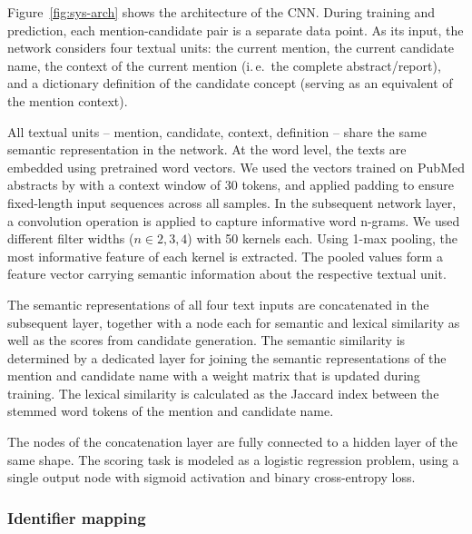 \documentclass{bioinfo}
\newcommand{\ie}{i.\,e.\ }
\begin{document}
Figure~\ref{fig:sys-arch} shows the architecture of the CNN.
During training and prediction, each mention-candidate pair is a separate data point.
As its input, the network considers four textual units:
the current mention, the current candidate name, the context of the current mention (\ie the complete abstract/report), and a dictionary definition of the candidate concept (serving as an equivalent of the mention context).

All textual units -- mention, candidate, context, definition – share the same semantic representation in the network.
At the word level, the texts are embedded using pretrained word vectors.
We used the vectors trained on PubMed abstracts by \cite{chiu-et-al:2016:BioNLP} with a context window of 30 tokens,  %
and applied padding to ensure fixed-length input sequences across all samples.
In the subsequent network layer, a convolution operation is applied to capture informative word n-grams.
We used different filter widths ($n \in {2,3,4}$) with 50 kernels each.
Using 1-max pooling, the most informative feature of each kernel is extracted.
The pooled values form a feature vector carrying semantic information about the respective textual unit.

The semantic representations of all four text inputs are concatenated in the subsequent layer, together with a node each for semantic and lexical similarity as well as the scores from candidate generation.
The semantic similarity is determined by a dedicated layer for joining the semantic representations of the mention and candidate name with a weight matrix that is updated during training.
The lexical similarity is calculated as the Jaccard index  %
between the stemmed word tokens \citep{porter:1980} of the mention and candidate name.

The nodes of the concatenation layer are fully connected to a hidden layer of the same shape.
The scoring task is modeled as a logistic regression problem, using a single output node with sigmoid activation and binary cross-entropy loss.

\subsubsection{Identifier mapping}
\label{ssub:id-mapping}
\end{document}

